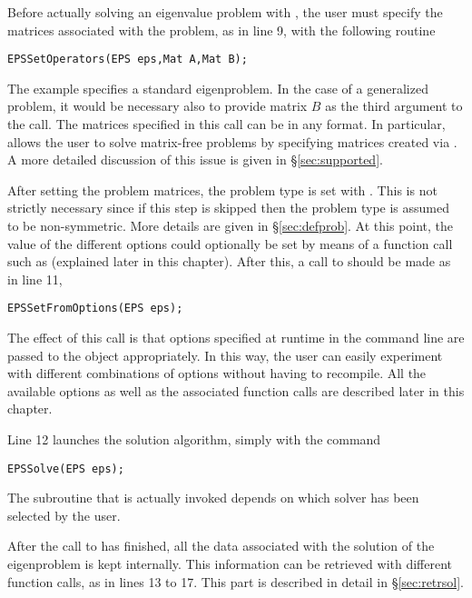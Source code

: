 	Before actually solving an eigenvalue problem with , the user must specify the matrices associated with the problem, as in line 9, with the following routine
	\begin{Verbatim}[fontsize=\small]
	EPSSetOperators(EPS eps,Mat A,Mat B);
	\end{Verbatim}
	The example specifies a standard eigenproblem. In the case of a generalized problem, it would be necessary also to provide matrix $B$ as the third argument to the call. The matrices specified in this call can be in any \petsc format. In particular,  allows the user to solve matrix-free problems by specifying matrices created via . A more detailed discussion of this issue is given in \S\ref{sec:supported}.

	After setting the problem matrices, the problem type is set with . This is not strictly necessary since if this step is skipped then the problem type is assumed to be non-symmetric. More details are given in \S\ref{sec:defprob}.
	At this point, the value of the different options could optionally be set by means of a function call such as  (explained later in this chapter). After this, a call to  should be made as in line 11,
	\begin{Verbatim}[fontsize=\small]
	EPSSetFromOptions(EPS eps);
	\end{Verbatim}
	The effect of this call is that options specified at runtime in the command line are passed to the  object appropriately. In this way, the user can easily experiment with different combinations of options without having to recompile. All the available options as well as the associated function calls are described later in this chapter.

	Line 12 launches the solution algorithm, simply with the command
	\begin{Verbatim}[fontsize=\small]
	EPSSolve(EPS eps);
	\end{Verbatim}
	The subroutine that is actually invoked depends on which solver has been selected by the user.

        After the call to  has finished, all the data associated with the solution of the eigenproblem is kept internally. This information can be retrieved with different function calls, as in lines 13 to 17. This part is described in detail in \S\ref{sec:retrsol}.

